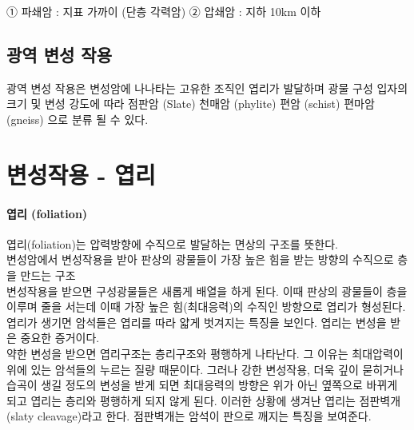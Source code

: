 \documentclass[12pt, a4paper, twoside]{book}
\begin{document}
				① 파쇄암 : 지표 가까이 (단층 각력암)
				② 압쇄암 : 지하 10km 이하





		\subsection{광역 변성 작용}

				광역 변성 작용은 
				변성암에 나나타는 고유한 조직인 엽리가 발달하며
				광물 구성 입자의 크기 및 변성 강도에 따라
				점판암 (Slate)
				천매암 (phylite)
				편암 (schist)
				편마암 (gneiss) 으로 분류 될 수 있다.



	



	\clearpage
	\section{변성작용 - 엽리}
	
		\paragraph{엽리 (foliation)}

			엽리(foliation)는 압력방향에 수직으로 발달하는 면상의 구조를 뜻한다. \\

			변성암에서 변성작용을 받아 판상의 광물들이 가장 높은 힘을 받는 방향의 수직으로 층을 만드는 구조  \\

			변성작용을 받으면 구성광물들은 새롭게 배열을 하게 된다. 
			이때 판상의 광물들이 층을 이루며 줄을 서는데 이때 가장 높은 힘(최대응력)의 수직인 방향으로 엽리가 형성된다. 
			엽리가 생기면 암석들은 엽리를 따라 얇게 벗겨지는 특징을 보인다. 엽리는 변성을 받은 중요한 증거이다. \\

			약한 변성을 받으면 엽리구조는 층리구조와 평행하게 나타난다. 
			그 이유는 최대압력이 위에 있는 암석들의 누르는 질량 때문이다. 
			그러나 강한 변성작용, 더욱 깊이 묻히거나 습곡이 생길 정도의 변성을 받게 되면 최대응력의 방향은 위가 아닌 옆쪽으로 바뀌게 되고 엽리는 층리와 평행하게 되지 않게 된다. 
			이러한 상황에 생겨난 엽리는 점판벽개(slaty cleavage)라고 한다. 점판벽개는 암석이 판으로 깨지는 특징을 보여준다.
\end{document}
